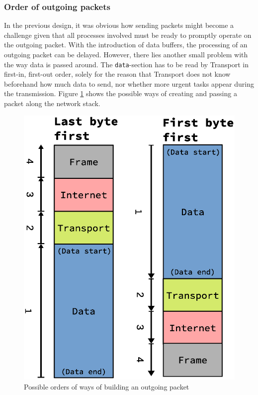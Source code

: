 \subsubsection{Order of outgoing packets}
In the previous design, it was obvious how sending packets might become a challenge
given that all processes involved must be ready to promptly operate on the 
outgoing packet. With the introduction of data buffers, the processing of an 
outgoing packet can be delayed.
However, there lies another small problem with the way data is passed around.
The \texttt{data}-section has to be read by Transport in first-in, first-out 
order, solely for the reason that Transport does not know beforehand how much 
data to send, nor whether more urgent tasks appear during the transmission.
Figure \ref{fig:sending_packet_order} shows the possible ways of creating and 
passing a packet along the network stack. 
\begin{figure}
    \centering
    \includegraphics[scale=0.45]{design/sending_packet_order.eps}
    \caption{Possible orders of ways of building an outgoing packet}
    \label{fig:sending_packet_order}
\end{figure}
